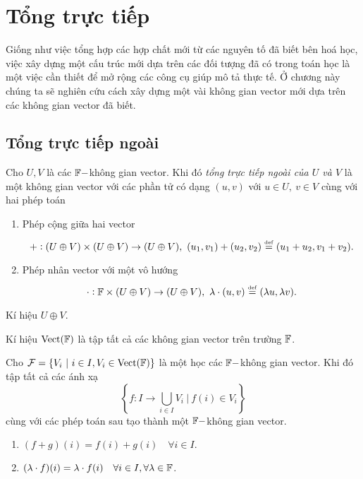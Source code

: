 \chapter{Tổng trực tiếp}
Giống như việc tổng hợp các hợp chất mới từ các nguyên tố đã biết bên hoá học, việc xây dựng một cấu trúc mới dựa trên các đối tượng đã có trong toán học là một việc cần thiết để mở rộng các công cụ giúp mô tả thực tế. Ở chương này chúng ta sẽ nghiên cứu cách xây dựng một vài không gian vector mới dựa trên các không gian vector đã biết.
\section{Tổng trực tiếp ngoài}
\begin{defn}
    Cho $U,V$ là các $\mathbb{F}-$không gian vector. Khi đó \textit{tổng trực tiếp ngoài của $U$ và $V$} là một không gian vector với các phần tử có dạng $(u,v)$ với $u \in U,~v \in V$ cùng với hai phép toán
    \begin{enumerate}
        \item Phép cộng giữa hai vector
        \[+: (U \oplus V) \times (U \oplus V) \to (U \oplus V),~(u_1,v_1)+(u_2,v_2) \overset{\underset{\mathrm{def}}{}}{=} (u_1+u_2,v_1+v_2).\]
        \item Phép nhân vector với một vô hướng 
        \[\cdot: \mathbb{F} \times (U \oplus V) \to (U \oplus V),~\lambda\cdot(u,v) \overset{\underset{\mathrm{def}}{}}{=} (\lambda u,\lambda v).\]
    \end{enumerate}
    Kí hiệu $U \oplus V$.
\end{defn}
\begin{defn}
    Kí hiệu $\text{Vect}(\mathbb{F})$ là tập tất cả các không gian vector trên trường $\mathbb{F}$.
\end{defn}
\begin{prop}
    Cho $\mathcal{F} = \{V_i~|~i \in I, V_i \in \text{Vect}(\mathbb{F})\}$ là một học các $\mathbb{F}-$không gian vector. Khi đó tập tất cả các ánh xạ 
    \[\left\{f: I \to \bigcup_{i\in I } V_i~\big|~f(i)\in V_i\right\}\]
    cùng với các phép toán sau tạo thành một $\mathbb{F}-$không gian vector.
    \begin{enumerate}
        \item $(f+g)(i) = f(i) + g(i) \quad \forall i \in I.$
        \item $(\lambda\cdot f)(i) = \lambda \cdot f(i) \quad \forall i \in I, \forall \lambda \in \mathbb{F}$.
    \end{enumerate}
\end{prop}
